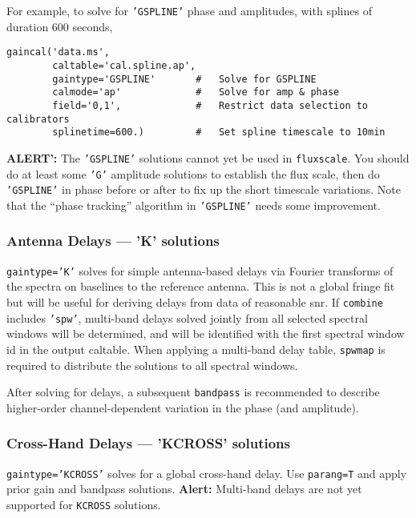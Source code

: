 For example, to solve for {\tt 'GSPLINE'} phase and amplitudes, with
splines of duration 600 seconds, 
\small
\begin{verbatim}
gaincal('data.ms',
        caltable='cal.spline.ap',
        gaintype='GSPLINE'       #   Solve for GSPLINE
        calmode='ap'             #   Solve for amp & phase
        field='0,1',             #   Restrict data selection to calibrators
        splinetime=600.)         #   Set spline timescale to 10min
\end{verbatim}
\normalsize

{\bf ALERT':} The {\tt 'GSPLINE'} solutions cannot yet be
used in {\tt fluxscale}.  You should do at least some {\tt 'G'}
amplitude solutions to establish the flux scale, then do 
{\tt 'GSPLINE'} in phase before or after to fix up the short 
timescale variations.  Note that the ``phase tracking'' algorithm
in {\tt 'GSPLINE'} needs some improvement.

\subsubsection{Antenna Delays --- 'K' solutions}
\label{section:cal.solve.gain.k}
{\tt gaintype='K'} solves for simple antenna-based delays
via Fourier transforms of the spectra on baselines to the
reference antenna. This is not a global fringe fit
but will be useful for deriving delays from data of
reasonable snr.  If {\tt combine} includes {\tt 'spw'},
multi-band delays solved jointly from all selected spectral 
windows will be determined, and will be identified with the
first spectral window id in the output caltable.  When applying
a multi-band delay table, {\tt spwmap} is required to distribute
the solutions to all spectral windows.

After solving for delays, a subsequent {\tt bandpass} is 
recommended to describe higher-order channel-dependent
variation in the phase (and amplitude).
\subsubsection{Cross-Hand  Delays --- 'KCROSS' solutions}
\label{section:cal.solve.gain.kcross}
{\tt gaintype='KCROSS'} solves for a global cross-hand
delay.  Use {\tt parang=T} and apply prior gain and
bandpass solutions.   
{\bf Alert:} Multi-band delays are not yet supported for {\tt KCROSS}
solutions.

